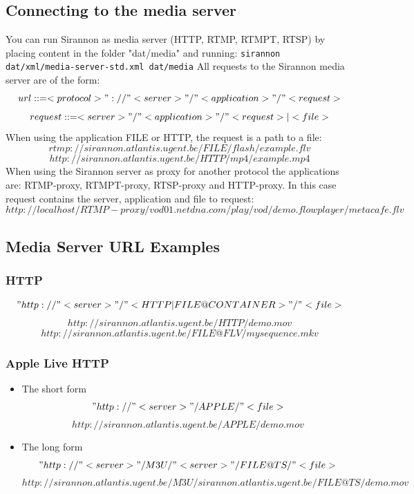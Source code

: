 \documentclass[12pt]{report}
\begin{document}
\subsection{Connecting to the media server}
You can run Sirannon as media server (HTTP, RTMP, RTMPT, RTSP) by placing content in the folder "dat/media" and running:
\newline\texttt{sirannon dat/xml/media-server-std.xml dat/media}\newline\newline
All requests to the Sirannon media server are of the form:
$$url ::= <protocol> "://" <server> "/" <application> "/" <request>$$
$$request ::= <server> "/" <application> "/" <request> | <file>$$\newline
When using the application FILE or HTTP, the request is a path to a file:
$$rtmp://sirannon.atlantis.ugent.be/FILE/flash/example.flv$$
$$http://sirannon.atlantis.ugent.be/HTTP/mp4/example.mp4$$\newline
When using the Sirannon server as proxy for another protocol the applications are: RTMP-proxy, RTMPT-proxy, RTSP-proxy and HTTP-proxy. In this case request contains the server, application and file to request:
$$http://localhost/RTMP-proxy/vod01.netdna.com/play/vod/demo.flowplayer/metacafe.flv$$\newline

\subsection{Media Server URL Examples}
\subsubsection{HTTP}
$$"http://" <server> "/" <HTTP|FILE@CONTAINER> "/" <file>$$\newline
$$http://sirannon.atlantis.ugent.be/HTTP/demo.mov$$
$$http://sirannon.atlantis.ugent.be/FILE@FLV/mysequence.mkv$$

\subsubsection{Apple Live HTTP}
\begin{itemize}
\item The short form
$$"http://" <server> "/APPLE/" <file>$$\newline
$$http://sirannon.atlantis.ugent.be/APPLE/demo.mov$$

\item The long form
$$"http://" <server> "/M3U/" <server> "/FILE@TS/" <file>$$\newline
$$http://sirannon.atlantis.ugent.be/M3U/sirannon.atlantis.ugent.be/FILE@TS/demo.mov$$
\end{itemize}
\end{document}
